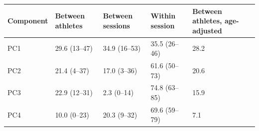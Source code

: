\begin{tabular}{lllll}
\toprule
Component & Between athletes & Between sessions & Within session & Between athletes, age-adjusted \\
\midrule
PC1 & 29.6 (13--47) & 34.9 (16--53) & 35.5 (26--46) & 28.2 \\
PC2 & 21.4 (4--37) & 17.0 (3--36) & 61.6 (50--73) & 20.6 \\
PC3 & 22.9 (12--31) & 2.3 (0--14) & 74.8 (63--85) & 15.9 \\
PC4 & 10.0 (0--23) & 20.3 (9--32) & 69.6 (59--79) & 7.1 \\
\bottomrule
\end{tabular}
